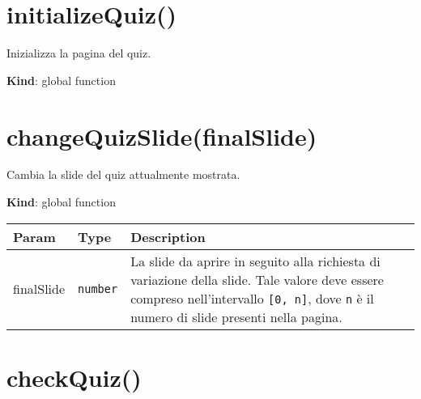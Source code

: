 \protect\hypertarget{initializeQuiz}{}{}

\hypertarget{initializequiz}{%
\section{initializeQuiz()}\label{initializequiz}}

Inizializza la pagina del quiz.

\textbf{Kind}: global function\\
\protect\hypertarget{changeQuizSlide}{}{}

\hypertarget{changequizslidefinalslide}{%
\section{changeQuizSlide(finalSlide)}\label{changequizslidefinalslide}}

Cambia la slide del quiz attualmente mostrata.

\textbf{Kind}: global function

\begin{longtabu} to \textwidth {X[1,L,m]X[1,L,m]X[1.5,L,m]}
\toprule
\begin{minipage}[b]{0.30\columnwidth}\raggedright
Param\strut
\end{minipage} & \begin{minipage}[b]{0.30\columnwidth}\raggedright
Type\strut
\end{minipage} & \begin{minipage}[b]{0.30\columnwidth}\raggedright
Description\strut
\end{minipage}\tabularnewline
\midrule
\endhead
\begin{minipage}[t]{0.30\columnwidth}\raggedright
finalSlide\strut
\end{minipage} & \begin{minipage}[t]{0.30\columnwidth}\raggedright
\texttt{number}\strut
\end{minipage} & \begin{minipage}[t]{0.30\columnwidth}\raggedright
La slide da aprire in seguito alla richiesta di variazione della slide.
Tale valore deve essere compreso nell'intervallo \texttt{{[}0,\ n{]}},
dove \texttt{n} è il numero di slide presenti nella pagina.\strut
\end{minipage}\tabularnewline
\bottomrule
\end{longtabu}

\protect\hypertarget{checkQuiz}{}{}

\hypertarget{checkquiz}{%
\section{checkQuiz()}\label{checkquiz}}

